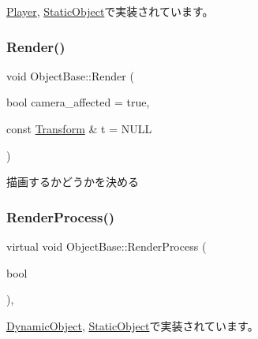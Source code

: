\mbox{\hyperlink{class_player_a1051f85c8bf18a256d275d1a1dee5da6}{Player}}, \mbox{\hyperlink{class_static_object_ae9563da84f7045d6206c938963d5aecf}{Static\+Object}}で実装されています。

\mbox{\label{class_object_base_ac84be5b56d23b8809ca08e27c0dcb16a}} 
\subsubsection{\texorpdfstring{Render()}{Render()}}
{\footnotesize\ttfamily void Object\+Base\+::\+Render (\begin{DoxyParamCaption}\item[{bool}]{camera\+\_\+affected = {\ttfamily true},  }\item[{const \mbox{\hyperlink{class_transform}{Transform}} \&}]{t = {\ttfamily NULL} }\end{DoxyParamCaption})}



描画するかどうかを決める 

\mbox{\label{class_object_base_aeac51d868beeb7f7fe900407b76b93a2}} 
\subsubsection{\texorpdfstring{Render\+Process()}{RenderProcess()}}
{\footnotesize\ttfamily virtual void Object\+Base\+::\+Render\+Process (\begin{DoxyParamCaption}\item[{bool}]{ }\end{DoxyParamCaption})\hspace{0.3cm}{\ttfamily [protected]}, {}}



\mbox{\hyperlink{class_dynamic_object_aa7488e1b4dfd7049447535d93d9d6783}{Dynamic\+Object}}, \mbox{\hyperlink{class_static_object_afec57009537695c4715386120a619942}{Static\+Object}}で実装されています。

\mbox{\label{class_object_base_a5b5672034139b22235ada326eb16dd3e}} 
